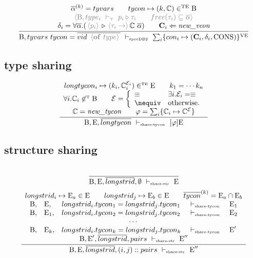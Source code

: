\documentclass[11pt,a4paper]{article}
\newcommand{\key}[1]{\textrm{\textbf{#1}}}
\newcommand{\B}  {\textrm{B}}
\newcommand{\E}  {\textrm{E}}
\newcommand{\sT} {\textrm{\tiny T}}
\newcommand{\TE} {\textrm{TE}}
\newcommand{\sTE}{\textrm{\tiny TE}}
\newcommand{\VE} {\textrm{VE}}
\newcommand{\tycon}{\mathbb{C}}
\newcommand{\vcon} {\mathbf{C}}
\newcommand{\equality}{\mathcal{E}}
\newcommand{\eqyes}{\equiv}
\newcommand{\eqnot}{\nequiv}
\newcommand{\VKC}  {\textrm{CONS}}
\newcommand{\corenew}[1]{\textit{new\_#1}}
\newcommand{\vdashSpecDBB} {\ \vdash_{\textrm{\tiny specDB2}}\ }
\newcommand{\vdashShareTycon}{\ \vdash_{\textrm{\tiny share-tycon}}\ }
\newcommand{\vdashShareStr}	{\ \vdash_{\textrm{\tiny share-str}}\ }
\newcommand{\vdashT}       {\ \vdash_{\textrm{\tiny T}}\ }
\newcommand{\braced}[1]{\{#1\}}
\newcommand{\angled}[1]{\,{\color{gray}\langle#1\rangle}\,}
\newcommand{\qualtype}[2]{#1 \triangleright #2}
\begin{document}
\[
\cfrac
 {\begin{array}{c}
  \overline{\alpha}^{(k)} = tyvars                 \qquad
  tycon \mapsto (k,\tycon) \in^\TE \B 	           \\
  \angled{\B,type_i \vdashT \qualtype{p_i}{\tau_i} \qquad
  free(\tau_i) \subseteq \overline{\alpha}}        \\
  \delta_i = \forall{\overline\alpha}.(
    \qualtype{\angled{p_i}}{{\angled{\tau_i \to }\tycon\ \overline\alpha}}) \qquad
  \vcon_i\Leftarrow\corenew{vcon}			       \\
  \end{array} }
 {
  \B,tyvars\ tycon = \overline{vid\ \angled{\key{of}\ type}} \vdashSpecDBB 
    \sum_i\braced{con_i \mapsto (\vcon_i,\delta_i,\VKC)}^\VE 
 }
\]

\subsection {type sharing}
\[
\cfrac
 {\begin{array}{c}
  longtycon_i \mapsto (k_i, \tycon_i^{\equality_i}) \in^\sTE \E \qquad
  k_1 = \cdots k_n                                              \\
  \forall i. \tycon_i \not\in^\sT \B \qquad
  \equality = \left\{\begin{array}{ll}
                \eqyes & \exists i. \equality_i = \eqyes \\
                \eqnot & \textrm{otherwise.}             \\
              \end{array}\right.                                \\
  \tycon = \corenew{tycon}  \qquad
  \varphi = \sum_i \braced{\tycon_i \mapsto \tycon^\equality}
  \end{array}}
 {\B, \E, \overline{longtycon} \vdashShareTycon [\varphi]\E}
\]
\subsection {structure sharing}
\[
\cfrac
 {}
 {\B,\E,\overline{longstrid}, \emptyset \vdashShareStr \E}
\]
\[
\cfrac
 {\begin{array}{c}
  longstrid_i \mapsto \E_a \in \E   \qquad
  longstrid_j \mapsto \E_b \in \E   \qquad
  \overline{tycon}^{(k)} = \E_a \cap \E_b \\
  \begin{array}{lllll}
  \B,&\E  ,&longstrid_i.tycon_1 = longstrid_j.tycon_1 &\vdashShareTycon &\E_1 \\
  \B,&\E_1,&longstrid_i.tycon_2 = longstrid_j.tycon_2 &\vdashShareTycon &\E_2 \\
  \multicolumn{5}{c}{\cdots}\\
  \B,&\E_k,&longstrid_i.tycon_k = longstrid_j.tycon_k &\vdashShareTycon &\E'  \\
  \end{array} \\
  \B,\E',\overline{longstrid}, pairs        \vdashShareStr \E''
  \end{array}}
 {\B,\E, \overline{longstrid}, (i,j)::pairs \vdashShareStr \E''}
\]
\end{document}
